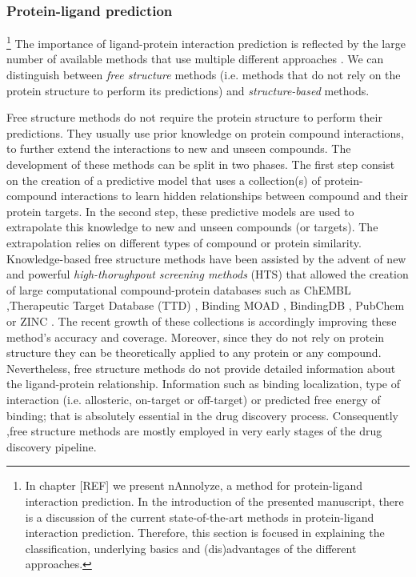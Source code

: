 \documentclass[12pt, a4paper,twoside]{tesi_upf}
\begin{document}
\subsubsection{Protein-ligand prediction}\label{prediction ligand-target}

\par  \footnote{In chapter [REF] we present nAnnolyze, a method for protein-ligand interaction prediction. In the introduction of the presented manuscript, there is a discussion of the current state-of-the-art methods in protein-ligand interaction prediction. Therefore, this section is focused in explaining the classification, underlying basics and (dis)advantages of the different approaches.} The importance of ligand-protein interaction prediction is reflected by the large number of available methods that use multiple different approaches \cite{Csermely2013, prathipati2015}. We can distinguish between \textit{free structure} methods (i.e. methods that do not rely on the protein structure to perform its predictions) and \textit{structure-based} methods.    
\par Free structure methods do not require the protein structure to perform their predictions. They usually use prior knowledge on protein compound interactions, to further extend the interactions to new and unseen compounds. The development of these methods can be split in two phases. The first step consist on the creation of a predictive model that uses a collection(s) of protein-compound interactions to learn hidden relationships between compound and their protein targets.  In the second step, these predictive models are used to extrapolate this knowledge to new and unseen compounds (or targets). The extrapolation relies on different types of compound or protein similarity. Knowledge-based free structure methods have been assisted by the advent of new and powerful \textit{high-thorughpout screening methods} (HTS) that allowed the creation of large computational compound-protein databases such as ChEMBL \cite{Bento2014},Therapeutic Target Database (TTD) \cite{Zhu2012a}, Binding MOAD \cite{Hu2005}, BindingDB \cite{Liu2007}, PubChem \cite{Kim2016, Wang2014} or ZINC \cite{Irwin2012}. The recent growth of these collections is accordingly improving these method's accuracy and coverage. Moreover, since they do not rely on protein structure they can be theoretically applied to any protein or any compound. Nevertheless, free structure methods do not provide detailed information about the ligand-protein relationship. Information such as binding localization, type of interaction (i.e. allosteric, on-target or off-target) or predicted free energy of binding;  that is absolutely essential in the drug discovery process. Consequently ,free structure methods are mostly employed in very early stages of the drug discovery pipeline. 
\end{document}
